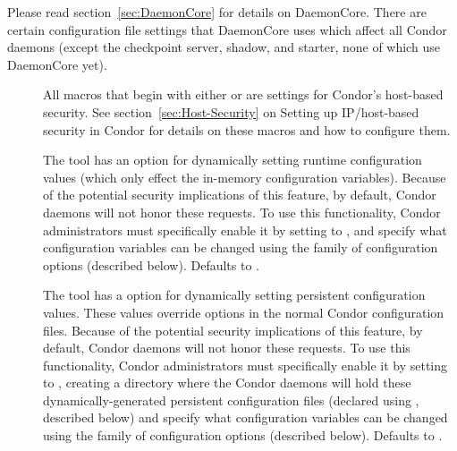 Please read section~\ref{sec:DaemonCore} for details
on DaemonCore.  There are certain configuration file settings that
DaemonCore uses which affect all Condor daemons (except the checkpoint
server, shadow, and starter, none of which use DaemonCore yet).
\begin{description}

\item[] \label{param:HostAllow} All
  macros that begin with either  or
   are settings for Condor's host-based security.
  See section~\ref{sec:Host-Security} on Setting up
  IP/host-based security in Condor for details on these
  macros and how to configure them.

\item[]
  \label{param:EnableRuntimeConfig}
  The  tool has an option  for
  dynamically setting runtime configuration values (which only effect
  the in-memory configuration variables).
  Because of the potential security implications of this feature, by
  default, Condor daemons will not honor these requests.
  To use this functionality, Condor administrators must specifically
  enable it by setting  to , and
  specify what configuration variables can be changed using the
   family of configuration options
  (described below).
  Defaults to .

\item[]
  \label{param:EnablePersistentConfig}
  The  tool has a  option for
  dynamically setting persistent configuration values.
  These values override options in the normal Condor configuration
  files.
  Because of the potential security implications of this feature, by
  default, Condor daemons will not honor these requests.
  To use this functionality, Condor administrators must specifically
  enable it by setting  to ,
  creating a directory where the Condor daemons will hold these
  dynamically-generated persistent configuration files (declared using
  , described below) and specify what
  configuration variables can be changed using the
   family of configuration options
  (described below).
  Defaults to .


\end{description}
